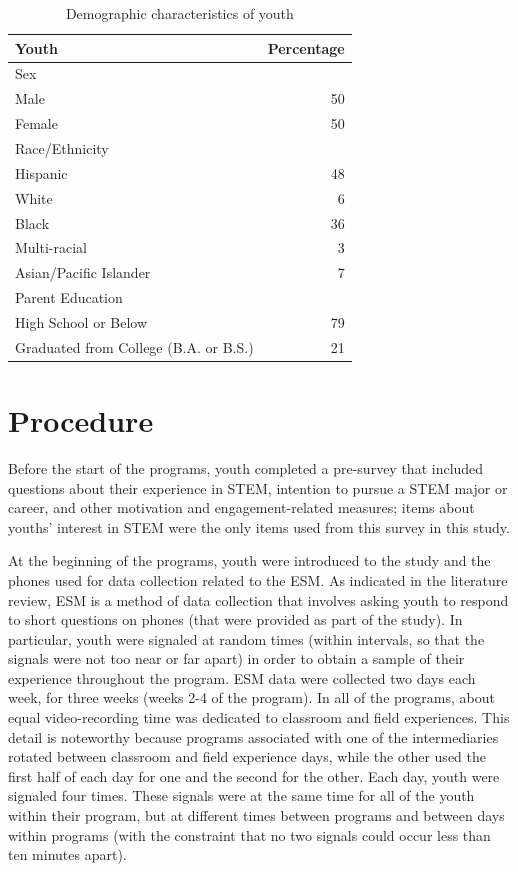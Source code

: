 \documentclass[]{book}
\theoremstyle{definition}
\theoremstyle{definition}
\theoremstyle{definition}
\theoremstyle{remark}
\begin{document}
\begin{table}

\caption{\label{tab:unnamed-chunk-2}Demographic characteristics of youth}
\centering
\begin{tabular}[t]{lr}
\toprule
Youth & Percentage\\
\midrule
Sex & \\
Male & 50\\
Female & 50\\
Race/Ethnicity & \\
Hispanic & 48\\
\addlinespace
White & 6\\
Black & 36\\
Multi-racial & 3\\
Asian/Pacific Islander & 7\\
Parent Education & \\
\addlinespace
High School or Below & 79\\
Graduated from College (B.A. or B.S.) & 21\\
\bottomrule
\end{tabular}
\end{table}

\section{Procedure}\label{procedure}

Before the start of the programs, youth completed a pre-survey that
included questions about their experience in STEM, intention to pursue a
STEM major or career, and other motivation and engagement-related
measures; items about youths' interest in STEM were the only items used
from this survey in this study.

At the beginning of the programs, youth were introduced to the study and
the phones used for data collection related to the ESM. As indicated in
the literature review, ESM is a method of data collection that involves
asking youth to respond to short questions on phones (that were provided
as part of the study). In particular, youth were signaled at random
times (within intervals, so that the signals were not too near or far
apart) in order to obtain a sample of their experience throughout the
program. ESM data were collected two days each week, for three weeks
(weeks 2-4 of the program). In all of the programs, about equal
video-recording time was dedicated to classroom and field experiences.
This detail is noteworthy because programs associated with one of the
intermediaries rotated between classroom and field experience days,
while the other used the first half of each day for one and the second
for the other. Each day, youth were signaled four times. These signals
were at the same time for all of the youth within their program, but at
different times between programs and between days within programs (with
the constraint that no two signals could occur less than ten minutes
apart).
\end{document}
